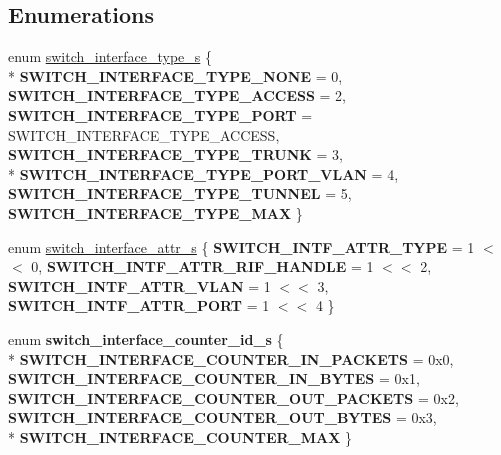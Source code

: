 \subsection*{Enumerations}
\begin{DoxyCompactItemize}
\item 
enum \hyperlink{group__Interface_ga641df0985dd7cb34a4f81a6939475b32}{switch\+\_\+interface\+\_\+type\+\_\+s} \{ \\*
{\bfseries S\+W\+I\+T\+C\+H\+\_\+\+I\+N\+T\+E\+R\+F\+A\+C\+E\+\_\+\+T\+Y\+P\+E\+\_\+\+N\+O\+N\+E} = 0, 
{\bfseries S\+W\+I\+T\+C\+H\+\_\+\+I\+N\+T\+E\+R\+F\+A\+C\+E\+\_\+\+T\+Y\+P\+E\+\_\+\+A\+C\+C\+E\+S\+S} = 2, 
{\bfseries S\+W\+I\+T\+C\+H\+\_\+\+I\+N\+T\+E\+R\+F\+A\+C\+E\+\_\+\+T\+Y\+P\+E\+\_\+\+P\+O\+R\+T} = S\+W\+I\+T\+C\+H\+\_\+\+I\+N\+T\+E\+R\+F\+A\+C\+E\+\_\+\+T\+Y\+P\+E\+\_\+\+A\+C\+C\+E\+S\+S, 
{\bfseries S\+W\+I\+T\+C\+H\+\_\+\+I\+N\+T\+E\+R\+F\+A\+C\+E\+\_\+\+T\+Y\+P\+E\+\_\+\+T\+R\+U\+N\+K} = 3, 
\\*
{\bfseries S\+W\+I\+T\+C\+H\+\_\+\+I\+N\+T\+E\+R\+F\+A\+C\+E\+\_\+\+T\+Y\+P\+E\+\_\+\+P\+O\+R\+T\+\_\+\+V\+L\+A\+N} = 4, 
{\bfseries S\+W\+I\+T\+C\+H\+\_\+\+I\+N\+T\+E\+R\+F\+A\+C\+E\+\_\+\+T\+Y\+P\+E\+\_\+\+T\+U\+N\+N\+E\+L} = 5, 
{\bfseries S\+W\+I\+T\+C\+H\+\_\+\+I\+N\+T\+E\+R\+F\+A\+C\+E\+\_\+\+T\+Y\+P\+E\+\_\+\+M\+A\+X}
 \}
\item 
enum \hyperlink{group__Interface_ga6fbf969f945ba342e8203504371e92c2}{switch\+\_\+interface\+\_\+attr\+\_\+s} \{ {\bfseries S\+W\+I\+T\+C\+H\+\_\+\+I\+N\+T\+F\+\_\+\+A\+T\+T\+R\+\_\+\+T\+Y\+P\+E} = 1 $<$$<$ 0, 
{\bfseries S\+W\+I\+T\+C\+H\+\_\+\+I\+N\+T\+F\+\_\+\+A\+T\+T\+R\+\_\+\+R\+I\+F\+\_\+\+H\+A\+N\+D\+L\+E} = 1 $<$$<$ 2, 
{\bfseries S\+W\+I\+T\+C\+H\+\_\+\+I\+N\+T\+F\+\_\+\+A\+T\+T\+R\+\_\+\+V\+L\+A\+N} = 1 $<$$<$ 3, 
{\bfseries S\+W\+I\+T\+C\+H\+\_\+\+I\+N\+T\+F\+\_\+\+A\+T\+T\+R\+\_\+\+P\+O\+R\+T} = 1 $<$$<$ 4
 \}
\item 
\hypertarget{group__Interface_gac11d649809f617ee7a37093e82533b79}{enum {\bfseries switch\+\_\+interface\+\_\+counter\+\_\+id\+\_\+s} \{ \\*
{\bfseries S\+W\+I\+T\+C\+H\+\_\+\+I\+N\+T\+E\+R\+F\+A\+C\+E\+\_\+\+C\+O\+U\+N\+T\+E\+R\+\_\+\+I\+N\+\_\+\+P\+A\+C\+K\+E\+T\+S} = 0x0, 
{\bfseries S\+W\+I\+T\+C\+H\+\_\+\+I\+N\+T\+E\+R\+F\+A\+C\+E\+\_\+\+C\+O\+U\+N\+T\+E\+R\+\_\+\+I\+N\+\_\+\+B\+Y\+T\+E\+S} = 0x1, 
{\bfseries S\+W\+I\+T\+C\+H\+\_\+\+I\+N\+T\+E\+R\+F\+A\+C\+E\+\_\+\+C\+O\+U\+N\+T\+E\+R\+\_\+\+O\+U\+T\+\_\+\+P\+A\+C\+K\+E\+T\+S} = 0x2, 
{\bfseries S\+W\+I\+T\+C\+H\+\_\+\+I\+N\+T\+E\+R\+F\+A\+C\+E\+\_\+\+C\+O\+U\+N\+T\+E\+R\+\_\+\+O\+U\+T\+\_\+\+B\+Y\+T\+E\+S} = 0x3, 
\\*
{\bfseries S\+W\+I\+T\+C\+H\+\_\+\+I\+N\+T\+E\+R\+F\+A\+C\+E\+\_\+\+C\+O\+U\+N\+T\+E\+R\+\_\+\+M\+A\+X}
 \}}\label{group__Interface_gac11d649809f617ee7a37093e82533b79}

\end{DoxyCompactItemize}
